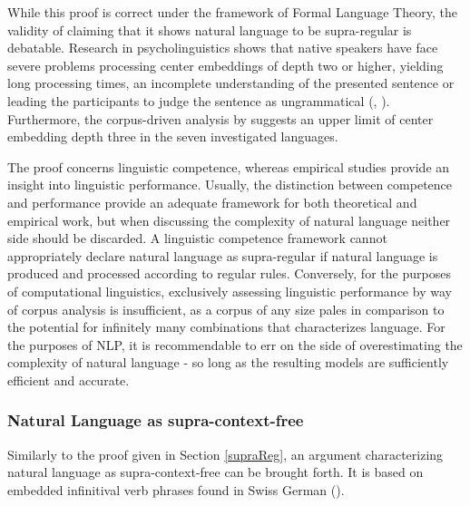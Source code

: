 While this proof is correct under the framework of Formal Language Theory, the validity of claiming that it shows natural language to be supra-regular is debatable. Research in psycholinguistics shows that native speakers have face severe problems processing center embeddings of depth two or higher, yielding long processing times, an incomplete understanding of the presented sentence or leading the participants to judge the sentence as ungrammatical (\cite{Hamilton1971}, \cite{Frank2016}). Furthermore, the corpus-driven analysis by \cite{Karlsson2007} suggests an upper limit of center embedding depth three in the seven investigated languages.

The proof concerns linguistic competence, whereas empirical studies provide an insight into linguistic performance. Usually, the distinction between competence and performance provide an adequate framework for both theoretical and empirical work, but when discussing the complexity of natural language neither side should be discarded. A linguistic competence framework cannot appropriately declare natural language as supra-regular if natural language is produced and processed according to regular rules. Conversely, for the purposes of computational linguistics, exclusively assessing linguistic performance by way of corpus analysis is insufficient, as a corpus of any size pales in comparison to the potential for infinitely many combinations that characterizes language. For the purposes of NLP, it is recommendable to err on the side of overestimating the complexity of natural language - so long as the resulting models are sufficiently efficient and accurate.

\subsubsection{Natural Language as supra-context-free}

Similarly to the proof given in Section \ref{supraReg}, an argument characterizing natural language as supra-context-free can be brought forth. It is based on embedded infinitival verb phrases found in Swiss German (\cite{Shieber1987}).


